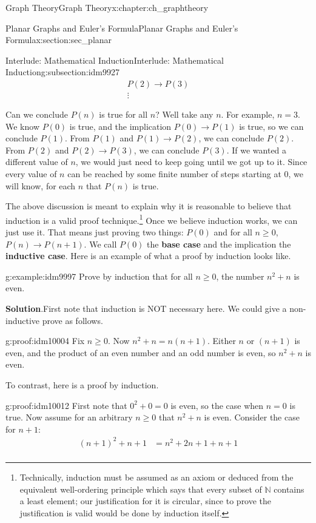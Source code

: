 \documentclass[oneside,10pt,]{book}
\newcommand{\terminology}[1]{\textbf{#1}}
\numberwithin{equation}{chapter}
\def\N{\mathbb N}
\def\imp{\rightarrow}
\newcommand{\amp}{&}
\begin{document}
\begin{chapterptx}{Graph Theory}{}{Graph Theory}{}{}{x:chapter:ch_graphtheory}
\begin{sectionptx}{Planar Graphs and Euler's Formula}{}{Planar Graphs and Euler's Formula}{}{}{x:section:sec_planar}
\begin{subsectionptx}{Interlude: Mathematical Induction}{}{Interlude: Mathematical Induction}{}{}{g:subsection:idm9927}
\begin{gather*}
P(2) \imp P(3)\\
\vdots
\end{gather*}
%
\par
Can we conclude \(P(n)\) is true for all \(n\)?  Well take any \(n\).  For example, \(n = 3\).  We know \(P(0)\) is true, and the implication \(P(0) \imp P(1)\) is true, so we can conclude \(P(1)\).  From \(P(1)\) and \(P(1) \imp P(2)\), we can conclude \(P(2)\).  From \(P(2)\) and \(P(2) \imp P(3)\), we can conclude \(P(3)\).  If we wanted a different value of \(n\), we would just need to keep going until we got up to it.  Since every value of \(n\) can be reached by some finite number of steps starting at 0, we will know, for each \(n\) that \(P(n)\) is true.%
\par
The above discussion is meant to explain why it is reasonable to believe that induction is a valid proof technique.\footnote{Technically, induction must be assumed as an axiom or deduced from the equivalent well-ordering principle which says that every subset of \(\N\) contains a least element; our justification for it is circular, since to prove the justification is valid would be done by induction itself.\label{g:fn:idm9989}}  Once we believe induction works, we can just use it.  That means just proving two things: \(P(0)\) and for all \(n \ge 0\), \(P(n) \imp P(n+1)\).  We call \(P(0)\) the \terminology{base case} and the implication the \terminology{inductive case}.  Here is an example of what a proof by induction looks like.%
\begin{example}{}{g:example:idm9997}%
Prove by induction that for all \(n \ge 0\), the number \(n^2 + n\) is even.%
\par\smallskip%
\noindent\textbf{Solution}.\hypertarget{g:solution:idm10002}{}\quad{}First note that induction is NOT necessary here.  We could give a non-inductive prove as follows.%
\begin{proofptx}{}{g:proof:idm10004}
Fix \(n \ge 0\).  Now \(n^2 + n = n(n+1)\).  Either \(n\) or \((n+1)\) is even, and the product of an even number and an odd number is even, so \(n^2 + n\) is even.%
\end{proofptx}
To contrast, here is a proof by induction.%
\begin{proofptx}{}{g:proof:idm10012}
First note that \(0^2 + 0 = 0\) is even, so the case when \(n = 0\) is true.  Now assume for an arbitrary \(n\ge 0\) that \(n^2 + n\) is even.  Consider the case for \(n+1\):%
\begin{align*}
(n+1)^2 + n+1 \amp = n^2 + 2n + 1 + n + 1\\

\end{align*}
\end{proofptx}
\end{example}
\end{subsectionptx}
\end{sectionptx}
\end{chapterptx}
\end{document}
